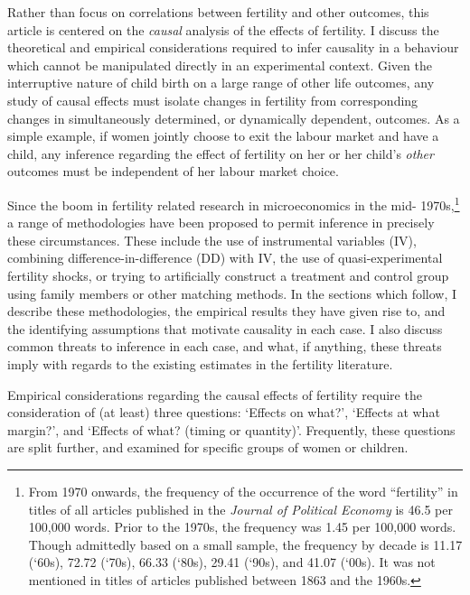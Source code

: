 \documentclass{article}
\begin{document}
\begin{spacing}{1.4}
Rather than focus on correlations between fertility and other outcomes, this 
article is centered on the \emph{causal} analysis of the effects of fertility.  
I discuss the theoretical and empirical considerations required to infer causality 
in a behaviour which cannot be manipulated directly in an experimental context.  
Given the interruptive nature of child birth on a large range of other life 
outcomes, any study of causal effects must isolate changes in fertility from 
corresponding changes in simultaneously determined, or dynamically dependent, 
outcomes.  As a simple example, if women jointly choose to exit the labour 
market and have a child, any inference regarding the effect of fertility on her 
or her child's \emph{other} outcomes must be independent of her labour market 
choice.

Since the boom in fertility related research in microeconomics in the mid-%
1970s,\footnote{From 1970 onwards, the frequency of the occurrence of the word 
``fertility'' 
in titles of all articles published in the \emph{Journal of Political Economy} 
is 46.5 per 100,000 words. Prior to the 1970s, the frequency was 1.45 per 
100,000 words. Though admittedly based on a small sample, the frequency by 
decade is 11.17 (`60s), 72.72 (`70s), 66.33 (`80s), 29.41 (`90s), and 41.07 
(`00s). It was not mentioned in titles of articles published between 1863 and 
the 1960s.} a range of methodologies have been proposed to permit inference 
in precisely these circumstances. These include the use of instrumental 
variables (IV), combining difference-in-difference (DD) with IV, the use of 
quasi-experimental fertility shocks, or trying to artificially construct a 
treatment and control group using family members or other matching 
methods.  In the sections which follow, I describe these methodologies, the
empirical results they have given rise to, and the identifying assumptions
that motivate causality in each case.  I also discuss common threats to
inference in each case, and what, if anything, these threats imply with
regards to the existing estimates in the fertility literature.

Empirical considerations regarding the causal effects of fertility require the
consideration of (at least) three questions: `Effects on what?', `Effects at
what margin?', and `Effects of what? (timing or quantity)'.  Frequently, these 
questions are split further, and examined for specific groups of women or 
children.


\end{spacing}
\end{document}
